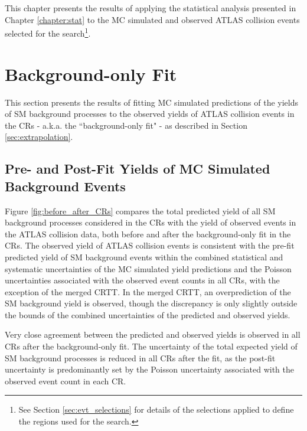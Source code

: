 \label{chapter:results}

This chapter presents the results of applying the statistical analysis presented in Chapter \ref{chapter:stat} to the MC simulated and observed ATLAS collision events selected for the search\footnote{See Section \ref{sec:evt_selections} for details of the selections applied to define the regions used for the search.}.  


\section{Background-only Fit}

This section presents the results of fitting MC simulated predictions of the yields of SM background processes to the observed yields of ATLAS collision events in the CRs - a.k.a. the ``background-only fit" - as described in Section \ref{sec:extrapolation}.

\subsection{Pre- and Post-Fit Yields of MC Simulated Background Events}

Figure \ref{fig:before_after_CRs} compares the total predicted yield of all SM background processes considered in the CRs with the yield of observed events in the ATLAS collision data, both before and after the background-only fit in the CRs. The observed yield of ATLAS collision events is consistent with the pre-fit predicted yield of SM background events within the combined statistical and systematic uncertainties of the MC simulated yield predictions and the Poisson uncertainties associated with the observed event counts in all CRs, with the exception of the merged CRTT. In the merged CRTT, an overprediction of the SM background yield is observed, though the discrepancy is only slightly outside the bounds of the combined uncertainties of the predicted and observed yields. 

Very close agreement between the predicted and observed yields is observed in all CRs after the background-only fit. The uncertainty of the total expected yield of SM background processes is reduced in all CRs after the fit, as the post-fit uncertainty is predominantly set by the Poisson uncertainty associated with the observed event count in each CR.

